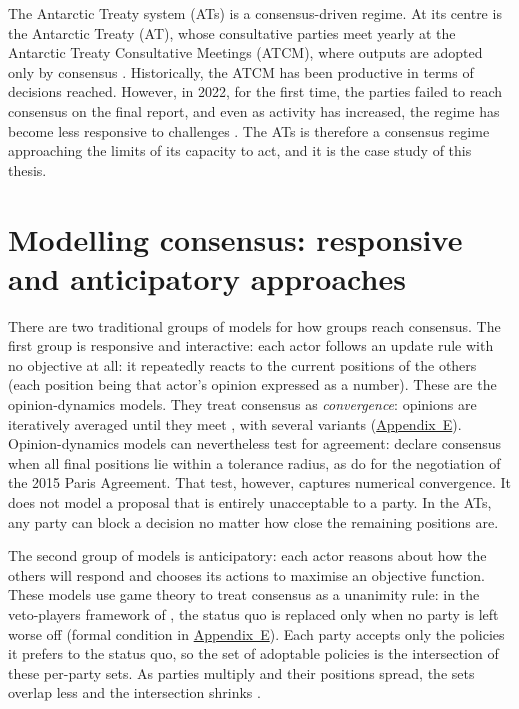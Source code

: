 The Antarctic Treaty system (ATs) is a consensus-driven regime. At its centre is the
Antarctic Treaty (AT), whose consultative parties meet yearly at the Antarctic Treaty
Consultative Meetings (ATCM), where outputs are adopted only by consensus \parencite{ATS2023RoP}.
Historically, the ATCM has been productive in terms of decisions reached. However, in 2022, for
the first time, the parties failed to reach consensus on the final report, and even as activity
has increased, the regime has become less responsive to challenges \parencite{Gardiner2025}. The
ATs is therefore a consensus regime approaching the limits of its capacity to act, and it is the
case study of this thesis.


\section{Modelling consensus: responsive and anticipatory approaches}
\label{sec:consensus}
There are two traditional groups of models for how groups reach consensus. The first group is responsive and interactive: each actor 
follows an update rule with no objective at all: it repeatedly reacts to
the current positions of the others (each position being that actor's opinion expressed as a number). These are the opinion-dynamics models.
 They treat consensus as \textit{convergence}: opinions are iteratively averaged until
they meet \parencite{DeGroot1974}, with several variants (\hyperref[app:e]{Appendix~E}).
Opinion-dynamics models can nevertheless test for agreement: declare consensus when all final
positions lie within a tolerance radius, as \textcite{Bernardo2021} do for the negotiation of the
2015 Paris Agreement. That test, however, captures numerical convergence. It does not model a proposal
that is entirely unacceptable to a party. In the ATs, any party can block a decision no matter how close
the remaining positions are.

The second group of models is anticipatory: each actor reasons about how the others will respond and
chooses its actions to maximise an objective function. These models use game theory to treat consensus as a
unanimity rule: in the veto-players framework of \textcite{Tsebelis2002}, the status quo is
replaced only when no party is left worse off (formal condition in \hyperref[app:e]{Appendix~E}). Each party accepts
only the policies it prefers to the status quo, so the set of adoptable policies is the
intersection of these per-party sets. As parties multiply and their positions spread, the sets
overlap less and the intersection shrinks \parencite{Tsebelis2002}.

